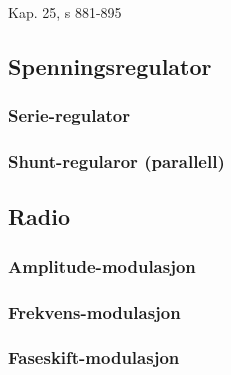 Kap. 25, s 881-895

\subsection{Spenningsregulator}
  
  \subsubsection{Serie-regulator}
    
  \subsubsection{Shunt-regularor (parallell)}
    
\subsection{Radio}
  \subsubsection{Amplitude-modulasjon}
    
  \subsubsection{Frekvens-modulasjon}
    
  \subsubsection{Faseskift-modulasjon}
    

